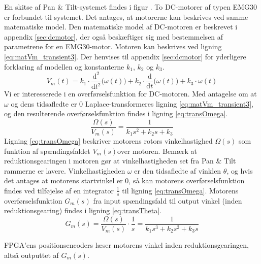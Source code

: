 En skitse af Pan \& Tilt-systemet findes i figur .
To DC-motorer af typen EMG30 er forbundet til systemet.
Det antages, at motorerne kan beskrives ved samme matematiske model.
Den matematiske model af DC-motoren er beskrevet i appendix \ref{sec:dcmotor},
der også beskæftiger sig med bestemmelsen af parametrene for en EMG30-motor.
Motoren kan beskrives ved ligning \ref{eq:matVm_transient3}. Der henvises til appendix \ref{sec:dcmotor}
for yderligere forklaring af modellen og konstanterne \(k_1\), \(k_2\) og \(k_3\).
\begin{equation}
	V_m\left(t\right)=k_1\cdot{}\frac{\mathrm d^2}{\mathrm d t^2} \big(\omega\left(t\right) \big)
		+k_2\cdot{}\frac{\mathrm d}{\mathrm d t} \big(\omega\left(t\right) \big)
		+k_3\cdot{}\omega\left(t\right)
	\label{eq:matVm_transient3}
 \end{equation}
Vi er interesserede i en overførselsfunktion for DC-motoren. Med antagelse om at \(\omega\) og dens tidsafledte er 0
Laplace-transformeres ligning \ref{eq:matVm_transient3}, og den resulterende overførselsfunktion findes
i ligning \ref{eq:transOmega}.
\begin{equation}
	\frac{\Omega\left(s\right)}{V_m\left(s\right)}=\frac{1}{k_1s^2+k_2s+k_3}
	\label{eq:transOmega}
 \end{equation}
Ligning \ref{eq:transOmega} beskriver motorens rotors vinkelhastighed \(\Omega\left(s\right)\) som funktion af spændingsfaldet
\(V_m\left(s\right)\)over motoren. Bemærk at reduktionsgearingen i motoren gør at vinkelhastigheden set fra Pan \& Tilt rammerne
er lavere.
Vinkelhastigheden \(\omega\) er den tidsafledte af vinklen \(\theta\),
og hvis det antages at motorens startvinkel er 0, så kan motorens overførselsfunktion
findes ved tilføjelse af en integrator \(\frac{1}{s}\) til ligning \ref{eq:transOmega}.
Motorens overførselsfunktion \(G_m\left(s\right)\) fra input spændingsfald til output vinkel (inden reduktionsgearing) findes
i ligning \ref{eq:transTheta}.
\begin{equation}
	G_m\left(s\right)=\frac{\Omega\left(s\right)}{V_m\left(s\right)}\cdot{}\frac{1}{s}=\frac{1}{k_1s^3+k_2s^2+k_3s}
	\label{eq:transTheta}
\end{equation}

FPGA'ens positionsencoders læser motorens vinkel inden reduktionsgearingen,
altså outputtet af \(G_m\left(s\right)\).

